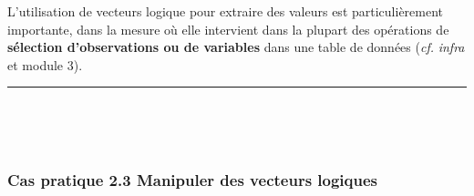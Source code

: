 \documentclass[12pt,twosided, notitlepage]{book}
\begin{document}
L'utilisation de vecteurs logique pour extraire des valeurs est
particulièrement importante, dans la mesure où elle intervient dans la
plupart des opérations de \textbf{sélection d'observations ou de
variables} dans une table de données (\emph{cf.} \emph{infra} et module
3).

\begin{center}\rule{0.5\linewidth}{\linethickness}\end{center}

~

~

\subsubsection{\texorpdfstring{\textbf{Cas pratique 2.3} Manipuler des
vecteurs
logiques}{Cas pratique 2.3 Manipuler des vecteurs logiques}}\label{cas-pratique-2.3-manipuler-des-vecteurs-logiques}

\end{document}
